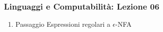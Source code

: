 




\begin{frame}[fragile]
	\frametitle{Linguaggi e Computabilità: Lezione 06}
\begin{enumerate}
\item
Passaggio Espressioni regolari a $\epsilon$-NFA
\end{enumerate}
\end{frame}



